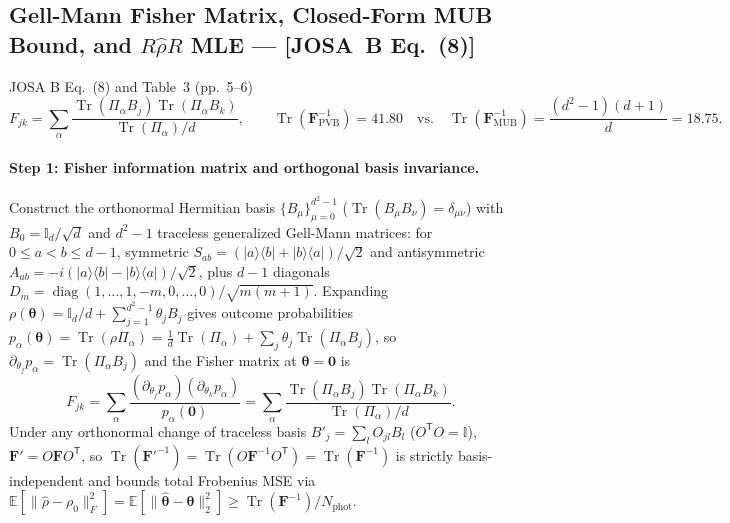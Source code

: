 \documentclass[10pt,letterpaper]{article}
\newcommand{\ket}[1]{\lvert #1 \rangle}
\newcommand{\bra}[1]{\langle #1 \rvert}
\newcommand{\norm}[1]{\lVert #1 \rVert}
\newcommand{\josb}[1]{\textbf{[JOSA~B Eq.~(#1)]}}
\numberwithin{equation}{section}
\begin{document}
\subsection{Gell-Mann Fisher Matrix, Closed-Form MUB Bound, and $R\hat{\rho}R$ MLE --- \josb{8}}
\label{sec:b5_fisher}

\begin{targeteq}{JOSA B Eq.~(8) and Table~3 (pp.~5--6)}
\[
  F_{jk} = \sum_\alpha \frac{\operatorname{Tr}(\Pi_\alpha B_j)\operatorname{Tr}(\Pi_\alpha B_k)}{\operatorname{Tr}(\Pi_\alpha)/d}, \qquad
  \operatorname{Tr}(\mathbf{F}_{\mathrm{PVB}}^{-1}) = 41.80 \quad\text{vs.}\quad \operatorname{Tr}(\mathbf{F}_{\mathrm{MUB}}^{-1}) = \frac{(d^2-1)(d+1)}{d} = 18.75.
\]
\end{targeteq}

\paragraph*{Step 1: Fisher information matrix and orthogonal basis invariance.}
Construct the orthonormal Hermitian basis $\{B_\mu\}_{\mu=0}^{d^2-1}$ ($\operatorname{Tr}(B_\mu B_\nu) = \delta_{\mu\nu}$) with $B_0 = \mathbb{I}_d/\sqrt{d}$ and $d^2 - 1$ traceless generalized Gell-Mann matrices: for $0 \le a < b \le d-1$, symmetric $S_{ab} = (\ket{a}\bra{b}+\ket{b}\bra{a})/\sqrt{2}$ and antisymmetric $A_{ab} = -i(\ket{a}\bra{b}-\ket{b}\bra{a})/\sqrt{2}$, plus $d-1$ diagonals $D_m = \operatorname{diag}(1,\dots,1,-m,0,\dots,0)/\sqrt{m(m+1)}$. Expanding $\rho(\boldsymbol{\theta}) = \mathbb{I}_d/d + \sum_{j=1}^{d^2-1}\theta_j B_j$ gives outcome probabilities $p_\alpha(\boldsymbol{\theta}) = \operatorname{Tr}(\rho\Pi_\alpha) = \frac{1}{d}\operatorname{Tr}(\Pi_\alpha) + \sum_j \theta_j \operatorname{Tr}(\Pi_\alpha B_j)$, so $\partial_{\theta_j} p_\alpha = \operatorname{Tr}(\Pi_\alpha B_j)$ and the Fisher matrix at $\boldsymbol{\theta} = \mathbf{0}$ is
\begin{equation}
  F_{jk} = \sum_\alpha \frac{(\partial_{\theta_j} p_\alpha)(\partial_{\theta_k} p_\alpha)}{p_\alpha(\mathbf{0})} = \sum_\alpha \frac{\operatorname{Tr}(\Pi_\alpha B_j)\operatorname{Tr}(\Pi_\alpha B_k)}{\operatorname{Tr}(\Pi_\alpha)/d}.
\end{equation}
Under any orthonormal change of traceless basis $B'_j = \sum_l O_{jl} B_l$ ($O^{\mathsf{T}} O = \mathbb{I}$), $\mathbf{F}' = O\mathbf{F} O^{\mathsf{T}}$, so $\operatorname{Tr}(\mathbf{F}'^{-1}) = \operatorname{Tr}(O\mathbf{F}^{-1} O^{\mathsf{T}}) = \operatorname{Tr}(\mathbf{F}^{-1})$ is strictly basis-independent and bounds total Frobenius MSE via $\mathbb{E}[\norm{\hat{\rho}-\rho_0}_F^2] = \mathbb{E}[\norm{\hat{\boldsymbol{\theta}}-\boldsymbol{\theta}}_2^2] \ge \operatorname{Tr}(\mathbf{F}^{-1})/N_{\mathrm{phot}}$.
\end{document}
